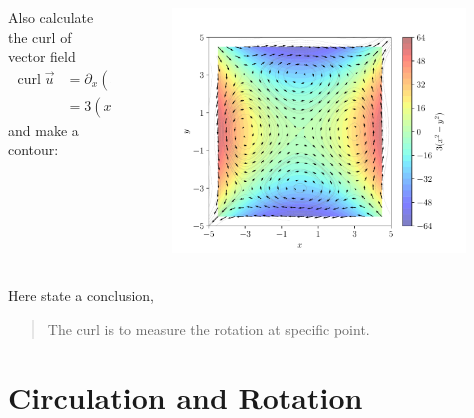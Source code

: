 \documentclass[11pt,]{beamer}
\begin{document}
\begin{frame}
	\begin{columns}[t]
		\begin{column}{0.5\textwidth}
			Also calculate the curl of vector field
			\begin{equation}
			\begin{aligned}
			\operatorname{curl} \vec{u} 
			&= \partial_{x}(x^3-9x)  - \partial_{y}(y^3-9y)\\
			&=3(x^3-y^2),
			\end{aligned}
			\end{equation}
			and make a contour:
		\end{column}
		\begin{column}{0.5\textwidth}
		\begin{figure}
	\includegraphics[page=1,width=0.98\textwidth]{flow-countour.pdf}
	\end{figure}
		\end{column}

	\end{columns}
	Here state a conclusion,
	\begin{quote}
	\bigskip
	The curl is to measure the rotation at specific point.
	\end{quote}
\end{frame}
\section{Circulation and Rotation}
\end{document}
